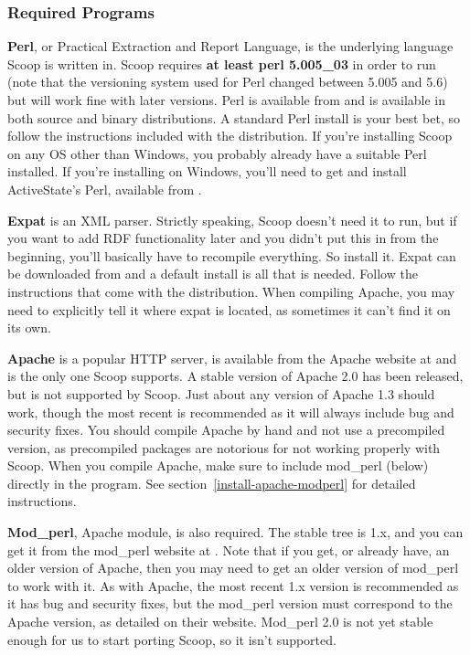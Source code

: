 \subsubsection{Required Programs}
\label{install-require}

{\bf Perl}, or Practical Extraction and Report Language, is the underlying language Scoop is written in. Scoop requires {\bf at least perl 5.005\_03} in order to run (note that the versioning system used for Perl changed between 5.005 and 5.6) but will work fine with later versions.  Perl is available from  and is available in both source and binary distributions.  A standard Perl install is your best bet, so follow the instructions included with the distribution.  If you're installing Scoop on any OS other than Windows, you probably already have a suitable Perl installed.  If you're installing on Windows, you'll need to get and install ActiveState's Perl, available from .

{\bf Expat} is an XML parser.  Strictly speaking, Scoop doesn't need it to run, but if you want to add RDF functionality later and you didn't put this in from the beginning, you'll basically have to recompile everything.  So install it.  Expat can be downloaded from  and a default install is all that is needed.  Follow the instructions that come with the distribution.  When compiling Apache, you may need to explicitly tell it where expat is located, as sometimes it can't find it on its own.

{\bf Apache} is a popular HTTP server, is available from the Apache website at  and is the only one Scoop supports. A stable version of Apache 2.0 has been released, but is not supported by Scoop. Just about any version of Apache 1.3 should work, though the most recent is recommended as it will always include bug and security fixes.  You should compile Apache by hand and not use a precompiled version, as precompiled packages are notorious for not working properly with Scoop.  When you compile Apache, make sure to include mod\_perl (below) directly in the program.  See section~\ref{install-apache-modperl} for detailed instructions.

{\bf Mod\_perl}, Apache module, is also required. The stable tree is 1.x, and you can get it from the mod\_perl website at . Note that if you get, or already have, an older version of Apache, then you may need to get an older version of mod\_perl to work with it.  As with Apache, the most recent 1.x version is recommended as it has bug and security fixes, but the mod\_perl version must correspond to the Apache version, as detailed on their website.  Mod\_perl 2.0 is not yet stable enough for us to start porting Scoop, so it isn't supported.

